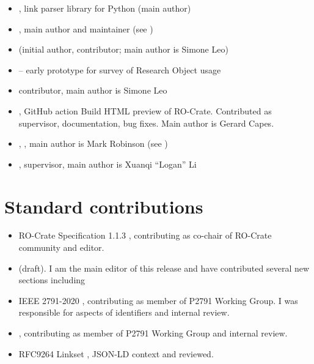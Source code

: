 \begin{itemize}
  \item  {} \cite{10.5281/zenodo.7256713}, link parser library for Python   (main author)
  \item  {}, main author and maintainer (see \cite{10.5281/zenodo.7463421})
  \item  {} \cite{ro-crate-py} (initial author, contributor; main author is Simone Leo)
  \item  {} --  early prototype for survey of Research Object usage
  \item  {} \cite{runcrate} contributor, main author is Simone Leo
  \item  {}, GitHub action Build HTML preview of RO-Crate. Contributed as supervisor, documentation, bug fixes.  Main author is Gerard Capes.
  \item  {} \cite{cwlviewer}, , main author is Mark Robinson (see \cite{10.7490/f1000research.1114375.1})
  \item {}, supervisor, main author is Xuanqi ``Logan'' Li
  
\end{itemize}

\section{Standard contributions}
\begin{itemize}
  \item RO-Crate Specification 1.1.3 \cite{rocrate1.1}, contributing as co-chair of RO-Crate community and editor.
  \item {} (draft). I am the main editor of this release and have contributed several new sections including 
  \item IEEE 2791-2020 \cite{ch5-64}, contributing as member of P2791 Working Group. I was responsible for aspects of identifiers and internal review.
  \item {}, contributing as member of P2791 Working Group and internal review.
  \item RFC9264 Linkset \cite{RFC9264},  JSON-LD context and reviewed.
\end{itemize}

